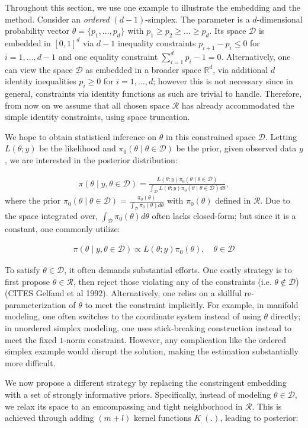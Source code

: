 \documentclass[10pt]{article}
\newcommand{\be}{\begin{equation}\begin{aligned}}
\newcommand{\ee}{\end{aligned}\end{equation}}
\newcommand{\mc}[1]{\mathcal{#1}}
\begin{document}
Throughout this section, we use one example to illustrate the embedding and the method. Consider an {\it ordered} $(d-1)$-simplex. The parameter is a $d$-dimensional probability vector $\theta=\{p_1,\ldots,p_d\}$ with $p_1\ge p_2 \ge \ldots \ge p_d$. Its space $\mc D$ is embedded in $[0,1]^d$ via $d-1$ inequality constraints $p_{i+1}-p_i \le 0$ for $i=1,\ldots, d-1$ and one equality constraint $\sum_{i=1}^{d} p_i-1 = 0$. Alternatively, one can view the space $\mc D$ as embedded in a broader space $\mathbb R^d$, via additional $d$ identity inequalities $p_i \ge 0$ for $i=1,\ldots,d$; however this is not necessary since in general, constraints via identity functions as such are trivial to handle. Therefore, from now on we assume that all chosen space $\mc R$ has already accommodated the simple identity constraints, using space truncation.

We hope to obtain statistical inference on $\theta$ in this constrained space $\mc D$. Letting $L(\theta;y)$ be the likelihood and $\pi_0(\theta \mid \theta \in \mc D)$ be the prior, given observed data $y$, we are interested in the posterior distribution: 

\be
\pi(\theta \mid y, \theta \in \mc D) = \frac{ L(\theta;y)\pi_0(\theta \mid \theta\in \mc D)}{\int_{\mc D} L(\theta;y)\pi_0(\theta \mid \theta\in \mc D) d\theta },
\ee
where the prior $\pi_0(\theta \mid \theta \in \mc D) = \frac {\pi_0(\theta)}{\int_{\mc D} \pi_0(\theta) d\theta}$ with $\pi_0(\theta)$ defined in $\mc R$. Due to the space integrated over, $\int_{\mc D} \pi_0(\theta) d\theta$ often lacks closed-form; but since it is a constant, one commonly utilize:

\be
\pi(\theta \mid y, \theta \in \mc D) \propto  L(\theta;y)\pi_0 (\theta), \quad\theta\in \mc D
\ee

To satisfy $\theta \in \mc D$, it often demands substantial efforts. One costly strategy is to first propose $\theta\in \mc R$, then reject those violating any of the constraints (i.e. $\theta \not\in \mc D$) (CITES Gelfand et al 1992). Alternatively, one relies on a skillful re-parameterization of $\theta$ to meet the constraint implicitly. For example, in manifold modeling, one often switches to the coordinate system instead of using $\theta$ directly; in unordered simplex modeling, one uses stick-breaking construction instead to meet the fixed $1$-norm constraint. However, any complication like the ordered simplex example would disrupt the solution, making the estimation substantially more difficult.

We now propose a different strategy by replacing the constringent embedding with a set of strongly informative priors. Specifically, instead of modeling $\theta \in \mc D$, we relax its space to an emcompassing and tight neighborhood in $\mc R$. This is achieved through adding $(m+l)$ kernel functions $K_.(.)$, leading to posterior: 
\end{document}
